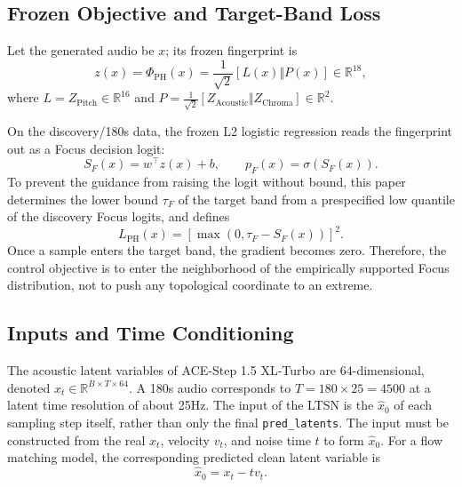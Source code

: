 \documentclass{article}
\begin{document}
\subsection{Frozen Objective and Target-Band Loss}

Let the generated audio be $x$; its frozen fingerprint is
\begin{equation}
z(x)=\Phi_{\mathrm{PH}}(x)
=\frac{1}{\sqrt{2}}\left[L(x)\Vert P(x)\right]\in\mathbb{R}^{18},
\end{equation}
where $L=Z_{\mathrm{Pitch}}\in\mathbb{R}^{16}$ and
$P=\frac{1}{\sqrt{2}}[Z_{\mathrm{Acoustic}}\Vert
Z_{\mathrm{Chroma}}]\in\mathbb{R}^{2}$.

On the discovery/180s data, the frozen L2 logistic regression reads the fingerprint out as a Focus decision logit:
\begin{equation}
S_F(x)=w^{\top}z(x)+b,\qquad p_F(x)=\sigma(S_F(x)).
\end{equation}
To prevent the guidance from raising the logit without bound, this paper determines the lower bound $\tau_F$ of the target band from a prespecified low quantile of the discovery Focus logits, and defines
\begin{equation}
L_{\mathrm{PH}}(x)=\left[\max\left(0,\tau_F-S_F(x)\right)\right]^2.
\label{eq:focus_band_loss}
\end{equation}
Once a sample enters the target band, the gradient becomes zero. Therefore, the control objective is to enter the neighborhood of the empirically supported Focus distribution, not to push any topological coordinate to an extreme.

\subsection{Inputs and Time Conditioning}

The acoustic latent variables of ACE-Step 1.5 XL-Turbo are $64$-dimensional, denoted $x_t\in\mathbb{R}^{B\times T\times64}$. A 180s audio corresponds to $T= 180 \times 25 = 4500$ at a latent time resolution of about 25Hz. The input of the LTSN is the $\hat{x}_0$ of each sampling step itself, rather than only the final \texttt{pred\_latents}. The input must be constructed from the real $x_t$, velocity $v_t$, and noise time $t$ to form $\hat x_0$. For a flow matching model, the corresponding predicted clean latent variable is
\begin{equation}
\hat{x}_0=x_t-tv_t.
\label{eq:pred_clean_latent}
\end{equation}
\end{document}
